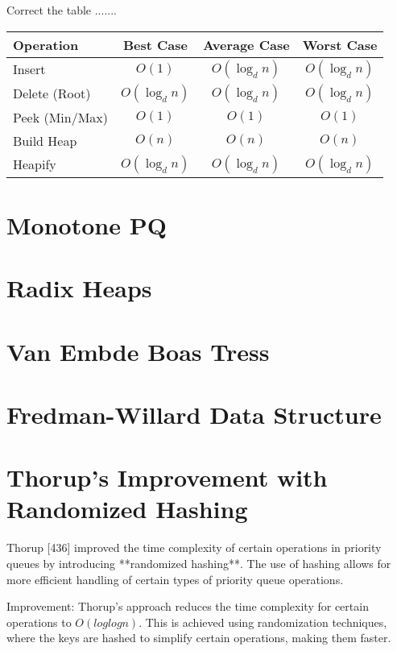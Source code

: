 \documentclass[a4paper,10pt]{article}
\begin{document}
Correct the table .......
\begin{table}[H]
    \begin{tabular}{|l|c|c|c|}
    \hline
    \textbf{Operation} & \textbf{Best Case} & \textbf{Average Case} & \textbf{Worst Case} \\
    \hline
    Insert & $O(1)$ & $O(\log_d n)$ & $O(\log_d n)$ \\
    \hline
    Delete (Root) & $O(\log_d n)$ & $O(\log_d n)$ & $O(\log_d n)$ \\
    \hline
    Peek (Min/Max) & $O(1)$ & $O(1)$ & $O(1)$ \\
    \hline
    Build Heap & $O(n)$ & $O(n)$ & $O(n)$ \\
    \hline
    Heapify & $O(\log_d n)$ & $O(\log_d n)$ & $O(\log_d n)$ \\
    \hline
    \end{tabular}
\end{table}


\section{Monotone PQ}

\section{Radix Heaps}

\section{Van Embde Boas Tress}

\section{Fredman-Willard Data Structure}

\section{Thorup's Improvement with Randomized Hashing}
Thorup [436] improved the time complexity of certain operations in priority queues by introducing **randomized hashing**. The use of hashing allows for more efficient handling of certain types of priority queue operations.

Improvement: Thorup's approach reduces the time complexity for certain operations to $O(log log n)$. This is achieved using randomization techniques, where the keys are hashed to simplify certain operations, making them faster.
\end{document}
